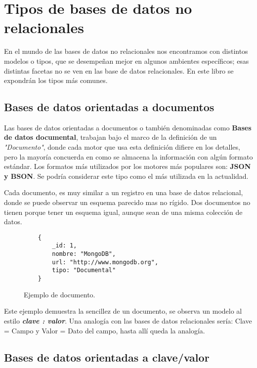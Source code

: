 \section{Tipos de bases de datos no relacionales}

En el mundo de las bases de datos no relacionales nos encontramos con distintos modelos o tipos, que se desempe\~nan mejor en algunos ambientes espec\'ificos; esas distintas facetas no se ven en las base de datos relacionales. En este libro se expondr\'an los tipos m\'as comunes.

\subsection{Bases de datos orientadas a documentos}

Las bases de datos orientadas a documentos o tambi\'en denominadas como {\bf Bases de datos documental}, trabajan bajo el marco de la definici\'on de un \textit{"Documento"}, donde cada motor que usa esta definici\'on difiere en los detalles, pero la mayor\'ia concuerda en como se almacena la informaci\'on con alg\'un formato est\'andar. Los formatos m\'as utilizados por los motores m\'as populares son: {\bf JSON y BSON}. Se podr\'ia  considerar este tipo como el m\'as utilizada en la actualidad.

Cada documento, es muy similar a un registro en una base de datos relacional, donde se puede observar un esquema parecido mas no r\'igido. Dos documentos no tienen porque tener un esquema igual, aunque sean de una misma colecci\'on de datos.

\begin{figure}[!ht]
    \centering
    \begin{lstlisting}
    {
	    _id: 1,
	    nombre: "MongoDB",
	    url: "http://www.mongodb.org",
	    tipo: "Documental"
    }
    \end{lstlisting}
    \caption[Bases de datos documental]{Ejemplo de documento.}
\end{figure}

Este ejemplo demuestra la sencillez de un documento, se observa un modelo al estilo \textit{\textbf{clave : valor}}. Una analog\'ia con las bases de datos relacionales ser\'ia: Clave = Campo y Valor = Dato del campo, hasta all\'i queda la analog\'ia.

\subsection{Bases de datos orientadas a clave/valor}

